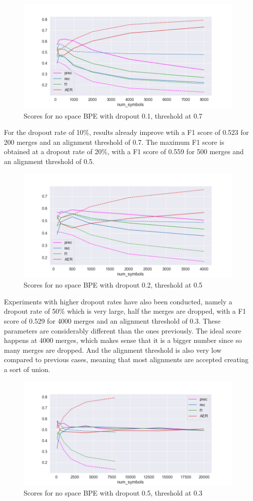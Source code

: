 \begin{figure}[!ht]
    \centering
    \includegraphics[width=12cm]{../reports/scores_dropout_bpe/no space/0.1/scores_ns_0.7_thres.png}
    \caption{Scores for no space BPE with dropout 0.1, threshold at 0.7}
\end{figure}

For the dropout rate of 10\%, results already improve wtih a F1 score of 0.523 for 200 merges and an alignment threshold of 0.7. The maximum F1 score is obtained at a dropout rate of 20\%, with a F1 score of 0.559 for 500 merges and an alignment threshold of 0.5.

\begin{figure}[!ht]
    \centering
    \includegraphics[width=12cm]{../reports/scores_dropout_bpe/no space/0.2/scores_ns_0.5_thres.png}
    \caption{Scores for no space BPE with dropout 0.2, threshold at 0.5}
\end{figure}

Experiments with higher dropout rates have also been conducted, namely a dropout rate of 50\% which is very large, half the merges are dropped, with a F1 score of 0.529 for 4000 merges and an alignment threshold of 0.3. These parameters are considerably different than the ones previously. The ideal score happens at 4000 merges, which makes sense that it is a bigger number since so many merges are dropped. And the alignment threshold is also very low compared to previous cases, meaning that most alignments are accepted creating a sort of union.

\begin{figure}[!ht]
    \centering
    \includegraphics[width=12cm]{../reports/scores_dropout_bpe/no space/0.5/scores_ns_0.3_thres.png}
    \caption{Scores for no space BPE with dropout 0.5, threshold at 0.3}
\end{figure}
